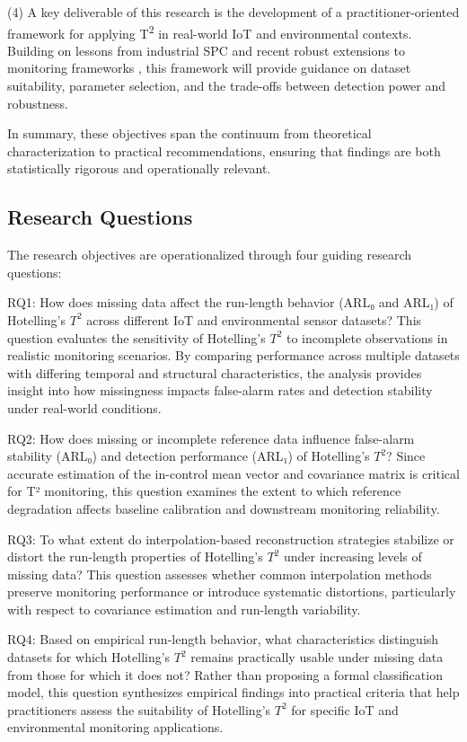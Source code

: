 (4) A key deliverable of this research is the development of a practitioner-oriented framework for applying T\textsuperscript{2} in real-world \ac{IoT} and environmental contexts. Building on lessons from industrial SPC \cite{Kourti2005} and recent robust extensions to monitoring frameworks \cite{Xie2024}\cite{Xie2023}, this framework will provide guidance on dataset suitability, parameter selection, and the trade-offs between detection power and robustness.


In summary, these objectives span the continuum from theoretical characterization to practical recommendations, ensuring that findings are both statistically rigorous and operationally relevant.

\subsection{Research Questions}
The research objectives are operationalized through four guiding research questions:

RQ1: How does missing data affect the run-length behavior (ARL₀ and ARL₁) of Hotelling’s $T^2$ across different IoT and environmental sensor datasets?
This question evaluates the sensitivity of Hotelling’s $T^2$ to incomplete observations in realistic monitoring scenarios. By comparing performance across multiple datasets with differing temporal and structural characteristics, the analysis provides insight into how missingness impacts false-alarm rates and detection stability under real-world conditions.

RQ2: How does missing or incomplete reference data influence false-alarm stability (ARL₀) and detection performance (ARL₁) of Hotelling’s $T^2$?
Since accurate estimation of the in-control mean vector and covariance matrix is critical for T² monitoring, this question examines the extent to which reference degradation affects baseline calibration and downstream monitoring reliability.

RQ3: To what extent do interpolation-based reconstruction strategies stabilize or distort the run-length properties of Hotelling’s $T^2$ under increasing levels of missing data?
This question assesses whether common interpolation methods preserve monitoring performance or introduce systematic distortions, particularly with respect to covariance estimation and run-length variability.

RQ4: Based on empirical run-length behavior, what characteristics distinguish datasets for which Hotelling’s $T^2$ remains practically usable under missing data from those for which it does not?
Rather than proposing a formal classification model, this question synthesizes empirical findings into practical criteria that help practitioners assess the suitability of Hotelling’s $T^2$ for specific IoT and environmental monitoring applications.

